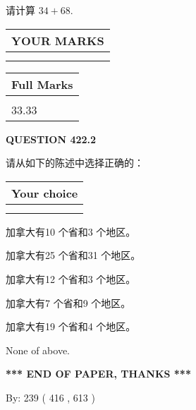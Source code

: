 \documentclass{ctexart}
\begin{document}
  
 
请计算 $ %
34 +  %
68 $.
 

 

 
  
\vspace{0.2in}
  
\noindent\begin{tabular}{|l|}
\hline
 YOUR MARKS  \\
\hline
 \\ 
 \\ 
\hline
\end{tabular}
\hspace{0.05in} \begin{tabular}{|l|}
\hline
 Full Marks  \\
\hline
 \\ 
33.33 \\
\hline
\end{tabular}
{\textbf{\Large{QUESTION
422.2 
}}}
  
  
请从如下的陈述中选择正确的：
  
  
\noindent\hspace{3.0in} \begin{tabular}{|l|}
\hline
Your choice \\
\hline
 \\ 
 \\ 
\hline
\end{tabular}
  
  
 
 
加拿大有10 个省和3 个地区。
 
 
加拿大有25 个省和31 个地区。
 
 
加拿大有12 个省和3 个地区。
 
 
加拿大有7 个省和9 个地区。
 
 
加拿大有19 个省和4 个地区。
 
 
 None of above.
 
 
   
   
 \vspace{0.2in}
 
   
   
   
   
\vspace{1.0in} 
{\textbf{\large{ *** END OF PAPER, THANKS *** }}} 
   
   
\hspace{1.0in} By: 
 239 ( 416 ,  613 )
   
\end{document}
